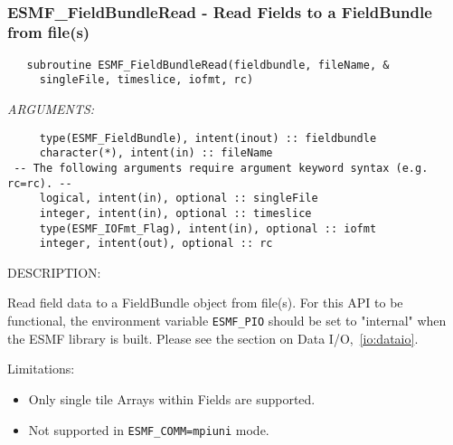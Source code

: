 \mbox{}\hrulefill\ 
 
\subsubsection [ESMF\_FieldBundleRead] {ESMF\_FieldBundleRead - Read Fields to a FieldBundle from file(s)}


   \label{api:FieldBundleRead}
\begin{verbatim}   subroutine ESMF_FieldBundleRead(fieldbundle, fileName, &
     singleFile, timeslice, iofmt, rc)\end{verbatim}{\em ARGUMENTS:}
\begin{verbatim}     type(ESMF_FieldBundle), intent(inout) :: fieldbundle
     character(*), intent(in) :: fileName
 -- The following arguments require argument keyword syntax (e.g. rc=rc). --
     logical, intent(in), optional :: singleFile
     integer, intent(in), optional :: timeslice
     type(ESMF_IOFmt_Flag), intent(in), optional :: iofmt
     integer, intent(out), optional :: rc\end{verbatim}
{\sf DESCRIPTION:\\ }


   Read field data to a FieldBundle object from file(s).
   For this API to be functional, the environment variable {\tt ESMF\_PIO}
   should be set to "internal" when the ESMF library is built.
   Please see the section on Data I/O,~\ref{io:dataio}.
  
   Limitations:
   \begin{itemize}
   \item Only single tile Arrays within Fields are supported.
   \item Not supported in {\tt ESMF\_COMM=mpiuni} mode.
   \end{itemize}
  
